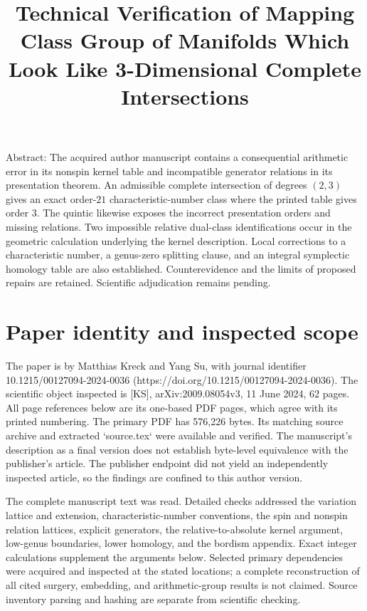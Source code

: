 \documentclass[10pt]{article}
\title{Technical Verification of
Mapping Class Group of Manifolds Which Look Like
3-Dimensional Complete Intersections}
\author{}
\date{}
\begin{document}
\maketitle
Abstract: The acquired author manuscript contains a consequential arithmetic error in its nonspin kernel table and incompatible generator relations in its presentation theorem. An admissible complete intersection of degrees \((2,3)\) gives an exact order-\(21\) characteristic-number class where the printed table gives order \(3\). The quintic likewise exposes the incorrect presentation orders and missing relations. Two impossible relative dual-class identifications occur in the geometric calculation underlying the kernel description. Local corrections to a characteristic number, a genus-zero splitting clause, and an integral symplectic homology table are also established. Counterevidence and the limits of proposed repairs are retained. Scientific adjudication remains pending.\par
\section*{Paper identity and inspected scope}
The paper is by Matthias Kreck and Yang Su, with journal identifier 10.1215/00127094-2024-0036 (https://doi.org/10.1215/00127094-2024-0036). The scientific object inspected is [KS], arXiv:2009.08054v3, 11 June 2024, 62 pages. All page references below are its one-based PDF pages, which agree with its printed numbering. The primary PDF has 576,226 bytes. Its matching source archive and extracted `source.tex` were available and verified. The manuscript’s description as a final version does not establish byte-level equivalence with the publisher’s article. The publisher endpoint did not yield an independently inspected article, so the findings are confined to this author version.\par
The complete manuscript text was read. Detailed checks addressed the variation lattice and extension, characteristic-number conventions, the spin and nonspin relation lattices, explicit generators, the relative-to-absolute kernel argument, low-genus boundaries, lower homology, and the bordism appendix. Exact integer calculations supplement the arguments below. Selected primary dependencies were acquired and inspected at the stated locations; a complete reconstruction of all cited surgery, embedding, and arithmetic-group results is not claimed. Source inventory parsing and hashing are separate from scientific checking.\par
\end{document}

